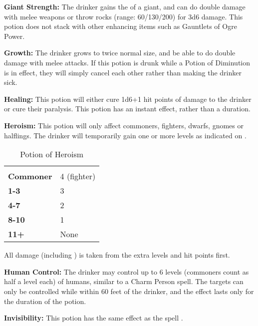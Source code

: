 \begin{multicols*}{2}
\textbf{Giant Strength:} The drinker gains the  of a giant, and can do double damage with melee weapons or throw rocks (range: 60/130/200) for 3d6 damage. This potion does not stack with other  enhancing items such as Gauntlets of Ogre Power.

\textbf{Growth:} The drinker grows to twice normal size, and be able to do double damage with melee attacks. If this potion is drunk while a Potion of Diminution is in effect, they will simply cancel each other rather than making the drinker sick.

\textbf{Healing:}\label{mitem:Potion of Healing} This potion will either cure 1d6+1 hit points of damage to the drinker or cure their paralysis. This potion has an instant effect, rather than a duration.

\textbf{Heroism:} This potion will only affect commoners, fighters, dwarfs, gnomes or halflings. The drinker will temporarily gain one or more levels as indicated on .

\begin {table}[H]
  \caption{Potion of Heroism}\label{tab:Potion of Heroism}
  \begin{tabularx}{\columnwidth}{>{\bfseries}YY}
		 & \\
	Commoner & 4 (fighter)\\
	1-3 & 3\\
	4-7 & 2\\
	8-10 & 1\\
	11+ & None
  \end {tabularx}
\end {table}

All damage (including ) is taken from the extra levels and hit points first.

\textbf{Human Control:} The drinker may control up to 6 levels (commoners count as half a level each) of humans, similar to a Charm Person spell. The targets can only be controlled while within 60 feet of the drinker, and the effect lasts only for the duration of the potion.

\textbf{Invisibility:} This potion has the same effect as the spell .


\end{multicols*}
